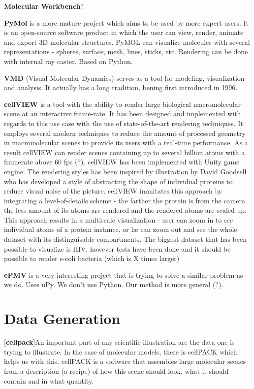 \documentclass[
  digital, %
  table,   %
  nolof,     %
  nolot,     %
]{fithesis3}
\begin{document}
\textbf{Molecular Workbench}?

\textbf{PyMol} is a more mature project which aims to be used by more expert users. It is an open-source software product in which the user can view, render, animate and export 3D molecular structures. PyMOL can visualize molecules with several representations - spheres, surface, mesh, lines, sticks, etc. Rendering can be done with internal ray caster. Based on Python.

\textbf{VMD} (Visual Molecular Dynamics) serves as a tool for modeling, visualization and analysis. It actually has a long tradition, bening first introduced in 1996.

\textbf{cellVIEW} is a tool with the ability to render large biological macromolecular scene at an interactive frame-rate. It has been designed and implemented with regards to this use case with the use of state-of-the-art rendering techniques. It employs several modern techniques to reduce the amount of processed geometry in macromolecular scenes to provide its users with a real-time performance. As a result cellVIEW can render scenes containing up to several billion atoms with a framerate above 60 fps (?). cellVIEW has been implemented with Unity game engine. The rendering styles has been inspired by illustration by David Goodsell who has developed a style of abstracting the shape of individual proteins to reduce visual noise of the picture. cellVIEW immitates this approach by integrating a level-of-details scheme - the farther the protein is from the camera the less amount of its atoms are rendered and the rendered atoms are scaled up. This approach results in a multiscale visualization - user can zoom in to see individual atoms of a protein instance, or he can zoom out and see the whole dataset with its distinguisable compartments. The biggest dataset that has been possible to visualize is HIV, however tests have been done and it should be possible to render e-coli bacteria (which is X times larger)

\textbf{ePMV} is a very interesting project that is trying to solve a similar problem as we do. Uses uPy. We don't use Python. Our method is more general (?).

\section{Data Generation}
[\textbf{cellpack}]An important part of any scientific illustration are the data one is trying to illustrate. In the case of molecular models, there is cellPACK which helps us with this. cellPACK is a software that assembles large molecular scenes from a description (a recipe) of how this scene should look, what it should contain and in what quantity.
\end{document}
